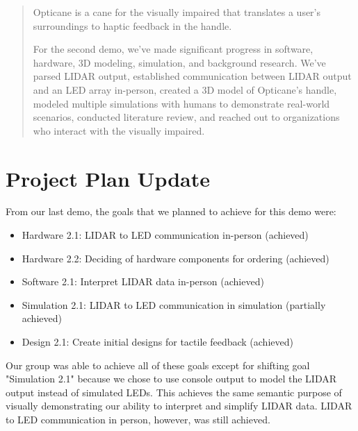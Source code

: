 \documentclass{article}
\begin{document}


\begin{abstract}
Opticane is a cane for the visually impaired that translates a user's surroundings to haptic feedback in the handle.

For the second demo, we've made significant progress in software, hardware, 3D modeling, simulation, and background research. We've parsed LIDAR output, established communication between LIDAR output and an LED array in-person, created a 3D model of Opticane's handle, modeled multiple simulations with humans to demonstrate real-world scenarios, conducted literature review, and reached out to organizations who interact with the visually impaired.
\end{abstract}

\section{Project Plan Update} 

From our last demo, the goals that we planned to achieve for this demo were:
\begin{itemize}
    \item Hardware 2.1: LIDAR to LED communication in-person (achieved)
    \item Hardware 2.2: Deciding of hardware components for ordering (achieved)
    \item Software 2.1: Interpret LIDAR data in-person (achieved)
    \item Simulation 2.1: LIDAR to LED communication in simulation (partially achieved)
    \item Design 2.1: Create initial designs for tactile feedback (achieved)
\end{itemize}

Our group was able to achieve all of these goals except for shifting goal "Simulation 2.1" because we chose to use console output to model the LIDAR output instead of simulated LEDs. This achieves the same semantic purpose of visually demonstrating our ability to interpret and simplify LIDAR data. LIDAR to LED communication in person, however, was still achieved.
\end{document}
